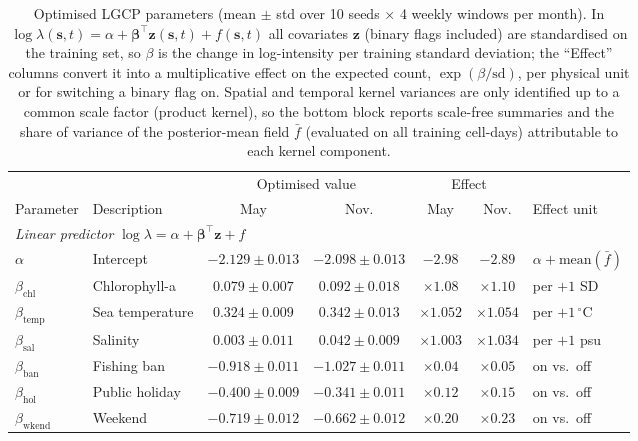 \begin{table}[t]
\centering
\caption{Optimised LGCP parameters (mean $\pm$ std over 10 seeds $\times$ 4 weekly windows per month).
In $\log\lambda(\mathbf{s},t)=\alpha+\boldsymbol{\beta}^\top\mathbf{z}(\mathbf{s},t)+f(\mathbf{s},t)$ all covariates $\mathbf{z}$ (binary flags included) are standardised on the training set, so $\beta$ is the change in log-intensity per training standard deviation;
the ``Effect'' columns convert it into a multiplicative effect on the expected count,
$\exp(\beta/\mathrm{sd})$, per physical unit or for switching a binary flag on.
Spatial and temporal kernel variances are only identified up to a common scale factor (product kernel),
so the bottom block reports scale-free summaries and the share of variance of the posterior-mean field $\bar f$
(evaluated on all training cell-days) attributable to each kernel component.}
\label{tab:lgcp_params_standalone}
\footnotesize
\setlength{\tabcolsep}{3.5pt}
\begin{tabular}{llcccc l}
\toprule
 & & \multicolumn{2}{c}{Optimised value} & \multicolumn{2}{c}{Effect} & \\
\cmidrule(lr){3-4}\cmidrule(lr){5-6}
Parameter & Description & May & Nov. & May & Nov. & Effect unit \\
\midrule
\multicolumn{7}{l}{\textit{Linear predictor} $\log\lambda=\alpha+\boldsymbol{\beta}^\top\mathbf{z}+f$} \\
$\alpha$ & Intercept & $-2.129 \pm 0.013$ & $-2.098 \pm 0.013$ & $-2.98$ & $-2.89$ & $\alpha+\mathrm{mean}(\bar f)$ \\
$\beta_{\mathrm{chl}}$ & Chlorophyll-a & $0.079 \pm 0.007$ & $0.092 \pm 0.018$ & $\times1.08$ & $\times1.10$ & per $+1$ SD \\
$\beta_{\mathrm{temp}}$ & Sea temperature & $0.324 \pm 0.009$ & $0.342 \pm 0.013$ & $\times1.052$ & $\times1.054$ & per $+1\,^\circ$C \\
$\beta_{\mathrm{sal}}$ & Salinity & $0.003 \pm 0.011$ & $0.042 \pm 0.009$ & $\times1.003$ & $\times1.034$ & per $+1$ psu \\
$\beta_{\mathrm{ban}}$ & Fishing ban & $-0.918 \pm 0.011$ & $-1.027 \pm 0.011$ & $\times0.04$ & $\times0.05$ & on vs.\ off \\
$\beta_{\mathrm{hol}}$ & Public holiday & $-0.400 \pm 0.009$ & $-0.341 \pm 0.011$ & $\times0.12$ & $\times0.15$ & on vs.\ off \\
$\beta_{\mathrm{wkend}}$ & Weekend & $-0.719 \pm 0.012$ & $-0.662 \pm 0.012$ & $\times0.20$ & $\times0.23$ & on vs.\ off \\

\end{tabular}
\end{table}
